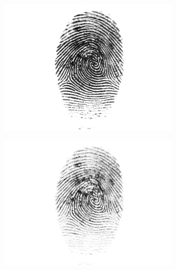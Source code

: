 \documentclass{beamer}
\begin{document}
{\begin{figure}[!ht]
\begin{subfigure}[ht]{0.15\textwidth}
            \includegraphics[width=\textwidth]{fingerprints/2004Db1a/1_3_src.jpg}
        \end{subfigure}
        \qquad
        \begin{subfigure}[ht]{0.15\textwidth}
            \includegraphics[width=\textwidth]{fingerprints/2004Db1a/1_3_background.jpg}
        \end{subfigure}
        \qquad
        \begin{subfigure}[ht]{0.15\textwidth}

\end{subfigure}
\end{figure}}
\end{document}
